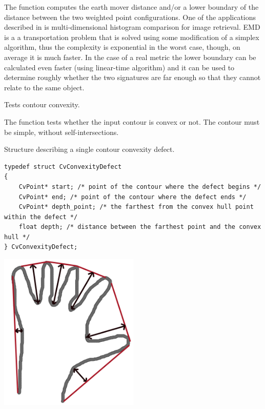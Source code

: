 The function computes the earth mover distance and/or
a lower boundary of the distance between the two weighted point
configurations. One of the applications described in  is
multi-dimensional histogram comparison for image retrieval. EMD is a a
transportation problem that is solved using some modification of a simplex
algorithm, thus the complexity is exponential in the worst case, though, on average
it is much faster. In the case of a real metric the lower boundary
can be calculated even faster (using linear-time algorithm) and it can
be used to determine roughly whether the two signatures are far enough
so that they cannot relate to the same object.

Tests contour convexity.


\begin{description}
\end{description}

The function tests whether the input contour is convex or not. The contour must be simple, without self-intersections.

\label{CvConvexityDefect}

Structure describing a single contour convexity defect.

\begin{lstlisting}
typedef struct CvConvexityDefect
{
    CvPoint* start; /* point of the contour where the defect begins */
    CvPoint* end; /* point of the contour where the defect ends */
    CvPoint* depth_point; /* the farthest from the convex hull point within the defect */
    float depth; /* distance between the farthest point and the convex hull */
} CvConvexityDefect;
\end{lstlisting}

\includegraphics[width=0.5\textwidth]{pics/defects.png}


